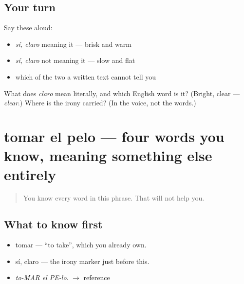 \subsection*{Your turn}
Say these aloud:

\begin{itemize}
\raggedright
  \item \emph{sí, claro} meaning it — brisk and warm
  \item \emph{sí, claro} not meaning it — slow and flat
  \item which of the two a written text cannot tell you
\end{itemize}

\begin{tcolorbox}[breakable,colback=teal!4,colframe=teal!35!black,title={Before you move on}]
What does \emph{claro} mean literally, and which English word is it? (Bright, clear — \emph{clear}.) Where is the irony carried? (In the voice, not the words.)
\end{tcolorbox}
\section[tomar el pelo]{tomar el pelo — four words you know, meaning something else entirely}

\label{lesson:ES-C272-tomar-el-pelo}



\begin{quote}
You know every word in this phrase. That will not help you.
\end{quote}

\subsection*{What to know first}
\begin{itemize}
\raggedright
  \item tomar — \textquotedblleft{}to take\textquotedblright{}, which you already own.
  \item sí, claro — the irony marker just before this.
\end{itemize}

\begin{sounds}
\begin{itemize}
\raggedright
  \item \emph{to-MAR el PE-lo}. $\to$ reference
\end{itemize}
\end{sounds}

